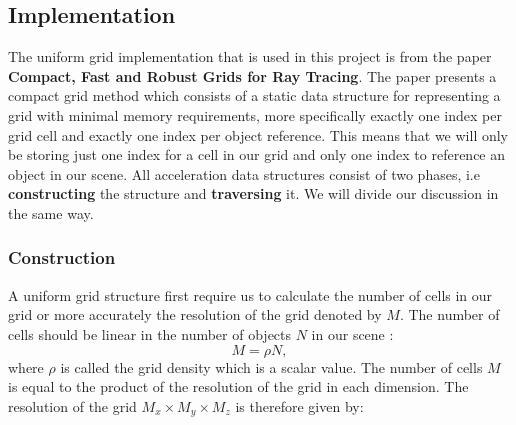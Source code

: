 \documentclass[11pt,a4paper]{article}
\begin{document}
\subsection{Implementation}
The uniform grid implementation that is used in this project is from the paper \textbf{Compact, Fast and Robust Grids for Ray Tracing}\cite{lagae2008compact}. The paper presents a compact grid method which consists of a static data structure for representing a grid with minimal memory requirements, more specifically exactly one index per grid cell and exactly one index per object reference. This means that we will only be storing just one index for a cell in our grid and only one index to reference an object in our scene. All acceleration data structures consist of two phases, i.e \textbf{constructing} the structure and \textbf{traversing} it. We will divide our discussion in the same way.
\subsubsection{Construction}
A uniform grid structure first require us to calculate the number of cells in our grid or more accurately the resolution of the grid denoted by $M$. The number of cells should be linear in the number of objects $N$ in our scene \cite{devillers1988methodes}:
\begin{equation}
M = \rho N,
\end{equation}
where $\rho$ is called the grid density which is a scalar value. The number of cells $M$ is equal to the product of the resolution of the grid in each dimension. The resolution of the grid $M_{x} \times M_{y} \times M_{z}$ is therefore given by:
\end{document}
